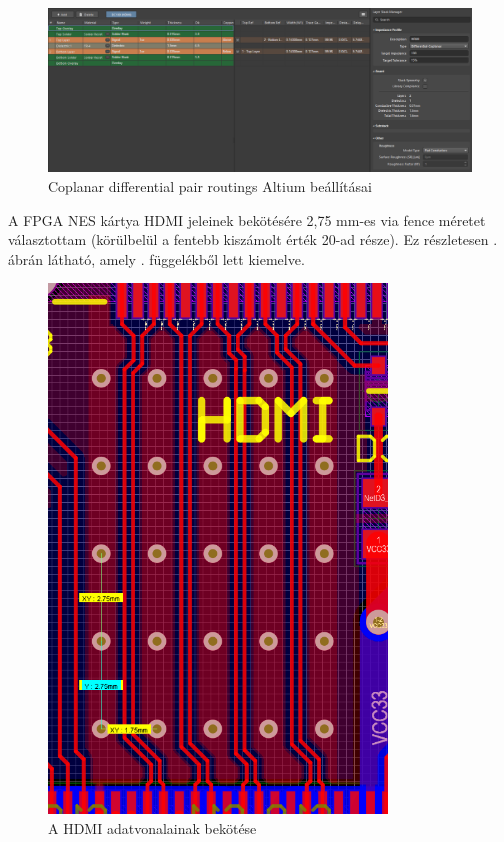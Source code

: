 	\begin{figure}[H]
		\centering
		\includegraphics[width=150mm, keepaspectratio]{figures/Impedance-control}
		\caption{Coplanar differential pair routings Altium beállításai}
		\label{fig:Impedance-control}
	\end{figure}
	
	A FPGA NES kártya HDMI jeleinek bekötésére 2,75 mm-es via fence méretet választottam (körülbelül a fentebb kiszámolt érték 20-ad része). Ez részletesen . ábrán látható, amely . függelékből lett kiemelve.
	
	\begin{figure}[H]
	\centering
	\includegraphics[width=90mm, keepaspectratio, angle=90]{figures/HDMI-Differencial-pair-routing}
	\caption{A HDMI adatvonalainak bekötése}
	\label{fig:HDMI-Differencial-pair-routing}
	\end{figure}
	
